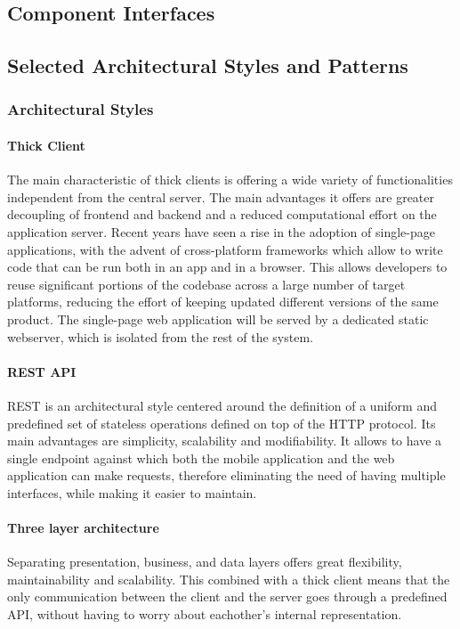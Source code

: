 \subsection{Component Interfaces}

\subsection{Selected Architectural Styles and Patterns}
\subsubsection{Architectural Styles}
\paragraph{Thick Client}
The main characteristic of thick clients is offering a wide variety of functionalities independent from the central server.
The main advantages it offers are greater decoupling of frontend and backend and a reduced computational effort on the application server.
Recent years have seen a rise in the adoption of single-page applications, with the advent of cross-platform frameworks which allow to write code that can be run both in an app and in a browser.
This allows developers to reuse significant portions of the codebase across a large number of target platforms, reducing the effort of keeping updated different versions of the same product.
The single-page web application will be served by a dedicated static webserver, which is isolated from the rest of the system.

\paragraph{REST API}
REST is an architectural style centered around the definition of a uniform and predefined set of stateless operations defined on top of the HTTP protocol.
Its main advantages are simplicity, scalability and modifiability.
It allows to have a single endpoint against which both the mobile application and the web application can make requests, therefore eliminating the need of having multiple interfaces, while making it easier to maintain.

\paragraph{Three layer architecture}
Separating presentation, business, and data layers offers great flexibility, maintainability and scalability.
This combined with a thick client means that the only communication between the client and the server goes through a predefined API, without having to worry about eachother's internal representation.

